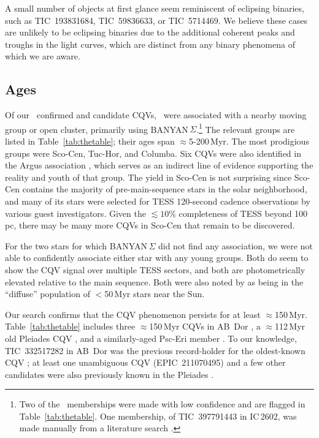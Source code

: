 \documentclass[11pt,twocolumn,tighten]{aastex63}
\begin{document}
A small number of objects at first glance seem reminiscent of
eclipsing binaries, such as TIC~193831684, TIC~59836633, or
TIC~5714469.  We believe these cases are unlikely to be eclipsing
binaries due to the additional coherent peaks and troughs in the light
curves, which are distinct from any binary phenomena of which we are
aware.



\subsection{Ages}

Of our \ncqvsnodebunked\ confirmed and candidate CQVs,
\nnotfieldbanyan\ were associated with a nearby moving group or open
cluster, primarily using BANYAN\,$\Sigma$.\footnote{Two of the
\nnotfieldbanyan\ memberships were made with low confidence and are
flagged in Table~\ref{tab:thetable}.  One membership, of TIC~397791443
in IC\,2602, was made manually from a literature search
\citep[e.g.][]{2020A&A...633A..99C}.}  The relevant groups are listed
in Table~\ref{tab:thetable}; their ages span $\approx$5-200\,Myr.  The
most prodigious groups were Sco-Cen, Tuc-Hor, and Columba.  Six CQVs
were also identified in the Argus association
\citep{2019ApJ...870...27Z}, which serves as an indirect line of
evidence supporting the reality and youth of that group.  The yield in
Sco-Cen is not surprising since Sco-Cen contains the majority of
pre-main-sequence stars in the solar neighborhood, and many of its
stars were selected for TESS 120-second cadence observations by
various guest investigators.  Given the $\lesssim$$10\%$ completeness
of TESS beyond 100\,pc, there may be many more CQVs in Sco-Cen that
remain to be discovered.  

For the two stars for which BANYAN\,$\Sigma$ did not find any
association, we were not able to confidently associate either star
with any young groups.  Both do seem to show the CQV signal over
multiple TESS sectors, and both are photometrically elevated relative
to the main sequence.  Both were also noted by
\citet{2021ApJ...917...23K} as being in the ``diffuse'' population of
$<$50\,Myr stars near the Sun.

Our search confirms that the CQV phenomenon persists for at least
$\approx$150\,Myr.  Table~\ref{tab:thetable} includes three
$\approx$150\,Myr CQVs in AB~Dor \citep{2015MNRAS.454..593B}, a
$\approx$112\,Myr old Pleiades CQV \citep{2015ApJ...813..108D}, and a
similarly-aged Psc-Eri member \citep{2020A&A...639A..64R}.  To our
knowledge, TIC~332517282 in AB~Dor was the previous record-holder for
the oldest-known CQV \citep{2019ApJ...876..127Z,2022AJ....163..144G};
at least one unambiguous CQV (EPIC~211070495) and a few other
candidates were also previously known in the Pleiades
\citep{2016AJ....152..114R}.  
\end{document}
